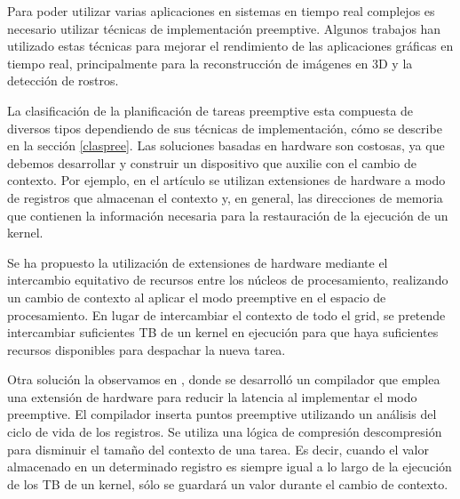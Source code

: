 Para poder utilizar varias aplicaciones en sistemas en tiempo real complejos es necesario utilizar técnicas de implementación preemptive. Algunos trabajos han utilizado estas técnicas para mejorar el rendimiento de las aplicaciones gráficas en tiempo real, principalmente para la reconstrucción de imágenes en 3D y la detección de rostros.
\newline

La clasificación de la planificación de tareas preemptive esta compuesta de diversos tipos dependiendo de sus técnicas de implementación, cómo se describe en la sección \ref{claspree}. 
Las soluciones basadas en hardware son costosas, ya que debemos desarrollar y construir un dispositivo que auxilie con el cambio de contexto. Por ejemplo, en el artículo \cite{18} se utilizan extensiones de hardware a modo de registros que almacenan el contexto y, en general, las direcciones de memoria que contienen la información necesaria para la restauración de la ejecución de un kernel. 

\vspace{0.3cm}

Se ha propuesto\cite{20} la utilización de extensiones de hardware mediante el intercambio equitativo de recursos entre los núcleos de procesamiento, realizando un cambio de contexto al aplicar el modo preemptive en el espacio de procesamiento. En lugar de intercambiar el contexto de todo el grid, se pretende intercambiar suficientes TB de un kernel en ejecución para que haya suficientes recursos disponibles para despachar la nueva tarea. 

\vspace{0.3cm}

Otra solución la observamos en \cite{8}, donde se desarrolló un compilador que emplea una extensión de hardware para reducir la latencia al implementar el modo preemptive. El compilador inserta puntos preemptive utilizando un análisis del ciclo de vida de los registros. Se utiliza una lógica de compresión descompresión para disminuir el tamaño del contexto de una tarea. Es decir, cuando el valor almacenado en un determinado registro es siempre igual a lo largo de la ejecución de los TB de un kernel, sólo se guardará un valor durante el cambio de contexto.
\newline

